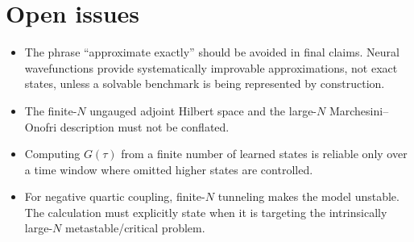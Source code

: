 \documentclass[11pt]{article}
\begin{document}
\section{Open issues}

\begin{itemize}
  \item The phrase ``approximate exactly'' should be avoided in final claims.
        Neural wavefunctions provide systematically improvable approximations,
        not exact states, unless a solvable benchmark is being represented by
        construction.
  \item The finite-\(N\) ungauged adjoint Hilbert space and the large-\(N\)
        Marchesini--Onofri description must not be conflated.
  \item Computing \(G(\tau)\) from a finite number of learned states is reliable
        only over a time window where omitted higher states are controlled.
  \item For negative quartic coupling, finite-\(N\) tunneling makes the model
        unstable.  The calculation must explicitly state when it is targeting
        the intrinsically large-\(N\) metastable/critical problem.
\end{itemize}
\end{document}
